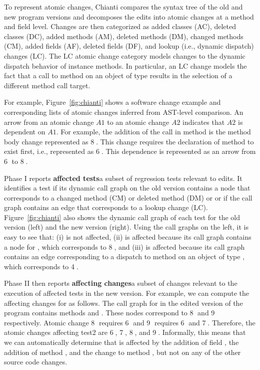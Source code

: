 To represent atomic changes, Chianti compares the syntax tree of the old and new program versions and decomposes the edits into atomic changes at a method and field level. Changes are then categorized as added classes (AC), deleted classes (DC), added methods (AM), deleted methods (DM), changed methods (CM), added fields (AF), deleted fields (DF), and lookup (i.e., dynamic dispatch) changes (LC). The LC atomic change category models changes to the dynamic dispatch behavior of instance methods. In particular, an LC change  models the fact that a call to method  on an object of type  results in the selection of a different method call target.

For example, Figure~\ref{fig:chianti} shows a software change example and corresponding lists of atomic changes inferred from AST-level comparison. An arrow from an atomic change $A1$ to an atomic change $A2$ indicates that $A2$ is dependent on $A1$. For example, the addition of the call  in method  is the method body change  represented as \textcircled{8}. This change  requires the declaration of method  to exist first, i.e.,  represented as \textcircled{6}. This dependence is represented as an arrow from \textcircled{6} to \textcircled{8}. 

Phase I reports {\bf affected tests}\textemdash a subset of regression tests relevant to edits. It identifies a test if its dynamic call graph on the old version contains a node that corresponds to a changed method (CM) or deleted method (DM)  or or if the call graph contains an edge that corresponds to a lookup change (LC). Figure~\ref{fig:chianti} also shows the dynamic call graph of each test for the old version (left) and the new version (right). Using the call graphs on the left, it is easy to see that: (i)  is not affected, (ii)  is affected because its call graph contains a node for , which corresponds to \textcircled{8}, and (iii)  is affected because its call graph contains an edge corresponding to a dispatch to method  on an object of type , which corresponds to \textcircled{4}. 

Phase II then reports {\bf affecting changes}\textemdash a subset of changes relevant to the execution of affected tests in the new version. For example, we can compute the affecting changes for  as follows. The call graph for  in the edited version of the program contains methods  and . These nodes correspond to \textcircled{8} and \textcircled{9} respectively. Atomic change \textcircled{8} requires \textcircled{6} and \textcircled{9} requires \textcircled{6} and \textcircled{7}. Therefore, the atomic changes affecting test2 are \textcircled{6}, \textcircled{7}, \textcircled{8}, and \textcircled{9}. Informally, this means that we can automatically determine that  is affected by the addition of field , the addition of method , and the change to method , but not on any of the other source code changes. 

